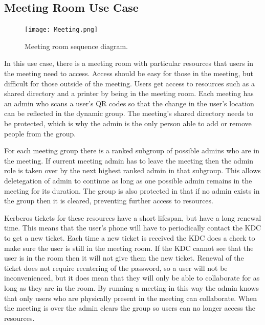 \documentclass[]{report}   %
\begin{document}
\subsection{Meeting Room Use Case}
\begin{figure}[H]
\centering
\texttt{[image: Meeting.png]}
\caption{Meeting room sequence diagram.}
\end{figure}
In this use case, there is a meeting room with particular resources that users in the meeting need to access. Access should be easy for those in the meeting, but difficult for those outside of the meeting. Users get access to resources such as a shared directory and a printer by being in the meeting room. Each meeting has an admin who scans a user's QR codes so that the change in the user's location can be reflected in the dynamic group. The meeting's shared directory needs to be protected, which is why the admin is the only person able to add or remove people from the group.

For each meeting group there is a ranked subgroup of possible admins who are in the meeting. If current meeting admin has to leave the meeting then the admin role is taken over by the next highest ranked admin in that subgroup. This allows deletegation of admin to continue as long as one possible admin remains in the meeting for its duration. The group is also protected in that if no admin exists in the group then it is cleared, preventing further access to resources.

Kerberos tickets for these resources have a short lifespan, but have a long renewal time. This means that the user's phone will have to periodically contact the KDC to get a new ticket. Each time a new ticket is received the KDC does a check to make sure the user is still in the meeting room. If the KDC cannot see that the user is in the room then it will not give them the new ticket. Renewal of the ticket does not require reentering of the password, so a user will not be inconvenienced, but it does mean that they will only be able to collaborate for as long as they are in the room. By running a meeting in this way the admin knows that only users who are physically present in the meeting can collaborate. When the meeting is over the admin clears the group so users can no longer access the resources.
\end{document}
